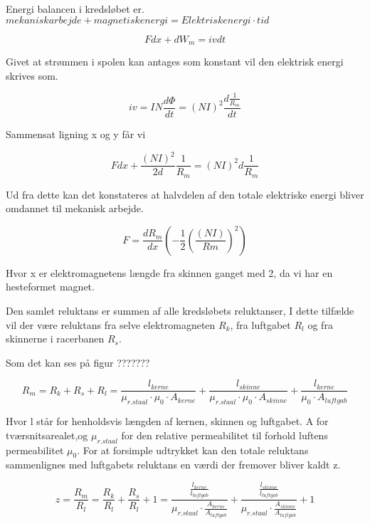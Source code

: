 Energi balancen i kredsløbet er.
$mekanisk arbejde + magnetisk energi =Elektrisk energi \cdot tid$

\begin{equation}
F dx + dW_m = iv dt
\end{equation}

Givet at strømmen i spolen kan antages som konstant vil den elektrisk energi skrives som.

\begin{equation}
iv=IN \frac{d\Phi}{dt} =(NI)^2  \frac{d\frac{1}{R_m}}{dt}
\end{equation}


Sammensat ligning x og y får vi

\begin{equation}
F dx+\frac{(NI)^2}{2d} \frac{1}{R_m} =(NI)^2  d \frac{1}{R_m}
\end{equation}

Ud fra dette kan det konstateres at halvdelen af den totale elektriske energi bliver omdannet til mekanisk arbejde.

\begin{equation}
F = \frac{dR_m}{dx} (-\frac{1}{2} (\frac{(NI)}{Rm} )^2 )
\end{equation}

Hvor x er elektromagnetens længde fra skinnen ganget med 2, da vi har en hesteformet magnet.

Den samlet reluktans er summen af alle kredsløbets reluktanser, I dette tilfælde vil der være reluktans fra selve elektromagneten $R_k$, fra luftgabet $R_l$ og fra skinnerne i racerbanen $R_s$.

Som det kan ses på figur ???????

\begin{equation}
R_m =R_k + R_s + R_l = \frac{l_{kerne}}{\mu_{r.staal} \cdot \mu_0 \cdot A_{kerne} } + \frac{l_{skinne}}{\mu_{r.staal} \cdot \mu_0 \cdot A_{skinne} }  + \frac{l_{kerne}}{\mu_0 \cdot A_{luftgab} }
\end{equation}

Hvor l står for henholdsvis længden af kernen, skinnen og luftgabet. A for tværsnitsarealet,og $ \mu_{r.staal} $ for den relative permeabilitet til forhold luftens permeabilitet $\mu_0$.  For at forsimple udtrykket kan den totale reluktans sammenlignes med luftgabets reluktans en værdi  der fremover bliver kaldt z.

\begin{equation}
z = \frac{R_m}{R_l} = \frac{R_k}{R_l} +\frac{R_s}{R_l} + 1 = \frac{
\frac{l_{kerne}}{l_{luftgab}} }
	{\mu_{r.staal} \cdot \frac{A_{kerne}}{A_{luftgab}} }
+
\frac{
	\frac{l_{skinne}}{l_{luftgab}} }
{\mu_{r.staal} \cdot \frac{A_{skinne}}{A_{luftgab}} }
+ 1
\end{equation}

